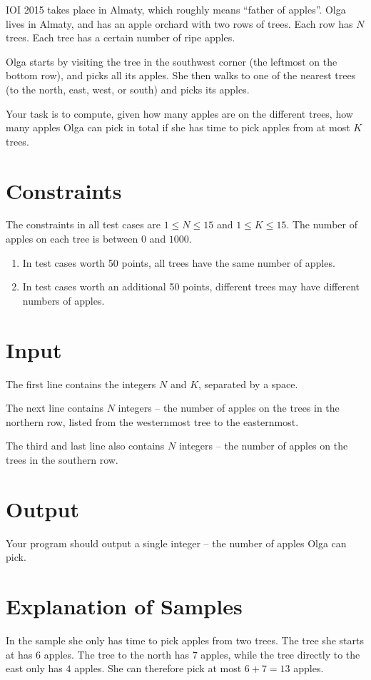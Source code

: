 
IOI 2015 takes place in Almaty, which roughly means ``father of apples''. Olga lives in Almaty, and has an apple orchard with two rows of trees.
Each row has $N$ trees. Each tree has a certain number of ripe apples.

Olga starts by visiting the tree in the southwest corner (the leftmost on the bottom row), and picks all its apples.
She then walks to one of the nearest trees (to the north, east, west, or south) and picks its apples.

Your task is to compute, given how many apples are on the different trees, how many apples Olga can pick in total
if she has time to pick apples from at most $K$ trees.

\section*{Constraints}
The constraints in all test cases are $1 \le N \le 15$ and $1 \le K \le 15$. The number of apples on each
tree is between $0$ and $1000$.

\begin{enumerate}
\item In test cases worth 50 points, all trees have the same number of apples.
\item In test cases worth an additional 50 points, different trees may have different numbers of apples.
\end{enumerate}

\section*{Input}
The first line contains the integers $N$ and $K$, separated by a space.

The next line contains $N$ integers -- the number of apples on the trees in the northern row, listed from the westernmost tree to the easternmost.

The third and last line also contains $N$ integers -- the number of apples on the trees in the southern row.

\section*{Output}
Your program should output a single integer -- the number of apples Olga can pick.

\section*{Explanation of Samples}
In the sample she only has time to pick apples from two trees. The tree she starts at has $6$ apples. The tree to the north has $7$ apples, while
the tree directly to the east only has $4$ apples. She can therefore pick at most $6 + 7 = 13$ apples.
